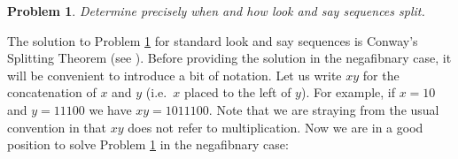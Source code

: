 \documentclass[reqno]{amsart}
\newtheorem{problem}{Problem}
\theoremstyle{definition}
\begin{document}



\begin{problem}\label{problem: splitting theorem}
    Determine precisely when and how look and say sequences split.
\end{problem}

The solution to Problem \ref{problem: splitting theorem} for standard look and say sequences is Conway's Splitting Theorem (see \cite{Conway}). Before providing the solution in the negafibnary case, it will be convenient to introduce a bit of notation. Let us write $xy$ for the concatenation of $x$ and $y$ (i.e.~$x$ placed to the left of $y$). For example, if $x=10$ and $y=11100$ we have $xy=1011100$. Note that we are straying from the usual convention in that $xy$ does not refer to multiplication. Now we are in a good position to solve Problem \ref{problem: splitting theorem} in the negafibnary case:
\end{document}
